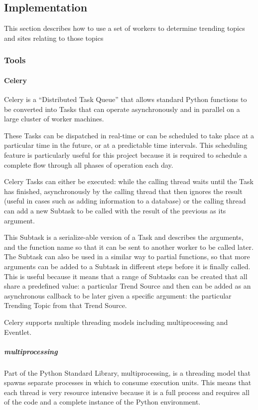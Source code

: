 \subsection{Implementation}
This section describes how to use a set of workers to determine trending topics and sites relating to those topics
\subsubsection{Tools}
\paragraph{Celery}
Celery is a ``Distributed Task Queue'' that allows standard Python functions to be converted into Tasks that can operate asynchronously and in parallel on a large cluster of worker machines.

These Tasks can be dispatched in real-time or can be scheduled to take place at a particular time in the future, or at a predictable time intervals.  This scheduling feature is particularly useful for this project because it is required to schedule a complete flow through all phases of operation each day.

Celery Tasks can either be executed: while the calling thread waits until the Task has finished,  asynchronously by the calling thread that then ignores the result (useful in cases such as adding information to a database) or the calling thread can add a new Subtask to be called with the result of the previous as its argument.

This Subtask is a serialize-able version of a Task and describes the arguments, and the function name so that it can be sent to another worker to be called later.  The Subtask can also be used in a similar way to partial functions, so that more arguments can be added to a Subtask in different steps before it is finally called.  This is useful because it means that a range of Subtasks can be created that all share a predefined value: a particular Trend Source and then can be added as an asynchronous callback to be later given a specific argument: the particular Trending Topic from that Trend Source.

Celery supports multiple threading models including multiprocessing and Eventlet.
\subparagraph{multiprocessing}
Part of the Python Standard Library, multiprocessing, is a threading model that spawns separate processes in which to consume execution units.  This means that each thread is very resource intensive because it is a full process and requires all of the code and a complete instance of the Python environment.

